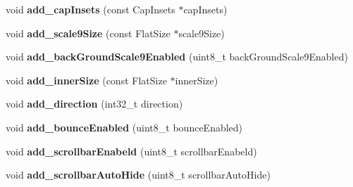 \begin{DoxyCompactItemize}
\mbox{\label{structflatbuffers_1_1ScrollViewOptionsBuilder_a20fc5ce3b240a443e1699dce5d5ca524}} 
void {\bfseries add\+\_\+cap\+Insets} (const Cap\+Insets $\ast$cap\+Insets)
\item 
\mbox{\label{structflatbuffers_1_1ScrollViewOptionsBuilder_ac11c417f639c6e3b12a16ea078926ff5}} 
void {\bfseries add\+\_\+scale9\+Size} (const Flat\+Size $\ast$scale9\+Size)
\item 
\mbox{\label{structflatbuffers_1_1ScrollViewOptionsBuilder_ad03ba96164fbaf0d83954e727a0b35e2}} 
void {\bfseries add\+\_\+back\+Ground\+Scale9\+Enabled} (uint8\+\_\+t back\+Ground\+Scale9\+Enabled)
\item 
\mbox{\label{structflatbuffers_1_1ScrollViewOptionsBuilder_a4741a0f2efe58ce88f52b60d57e4f3ca}} 
void {\bfseries add\+\_\+inner\+Size} (const Flat\+Size $\ast$inner\+Size)
\item 
\mbox{\label{structflatbuffers_1_1ScrollViewOptionsBuilder_a1a21909d83d8284d623328c19ecee826}} 
void {\bfseries add\+\_\+direction} (int32\+\_\+t direction)
\item 
\mbox{\label{structflatbuffers_1_1ScrollViewOptionsBuilder_a3366d28b5b03d8bf9a1b62505bbee4c7}} 
void {\bfseries add\+\_\+bounce\+Enabled} (uint8\+\_\+t bounce\+Enabled)
\item 
\mbox{\label{structflatbuffers_1_1ScrollViewOptionsBuilder_a086531958530f7e8768cc042ff0db263}} 
void {\bfseries add\+\_\+scrollbar\+Enabeld} (uint8\+\_\+t scrollbar\+Enabeld)
\item 
\mbox{\label{structflatbuffers_1_1ScrollViewOptionsBuilder_a8d44aa3ede093c492c29304d6b62e9f5}} 
void {\bfseries add\+\_\+scrollbar\+Auto\+Hide} (uint8\+\_\+t scrollbar\+Auto\+Hide)
\item 
\mbox{\label{structflatbuffers_1_1ScrollViewOptionsBuilder_ad5d6729a1cfa46b30fb20e3a2a6e8bda}} 

\end{DoxyCompactItemize}
